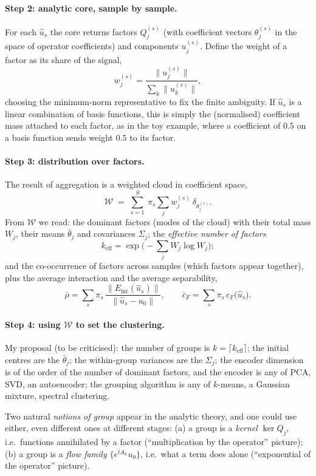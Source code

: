 \documentclass[11pt,a4paper]{article}
\newcommand{\Eint}{E_{\mathrm{int}}}
\begin{document}
\paragraph{Step 2: analytic core, sample by sample.}
For each $\hat u_s$ the core returns factors $Q^{(s)}_j$ (with coefficient vectors $\theta^{(s)}_j$ in the space of operator coefficients) and components $u^{(s)}_j$. Define the weight of a factor as its share of the signal,
\[
w^{(s)}_j=\frac{\|u^{(s)}_j\|}{\sum_k\|u^{(s)}_k\|},
\]
choosing the minimum-norm representative to fix the finite ambiguity. If $\hat u_s$ is a linear combination of basis functions, this is simply the (normalised) coefficient mass attached to each factor, as in the toy example, where a coefficient of $0.5$ on a basis function sends weight $0.5$ to its factor.

\paragraph{Step 3: distribution over factors.}
The result of aggregation is a weighted cloud in coefficient space,
\[
\mathcal W\;=\;\sum_{s=1}^{S}\ \pi_s\sum_{j}w^{(s)}_j\ \delta_{\theta^{(s)}_j}.
\]
From $\mathcal W$ we read: the dominant factors (modes of the cloud) with their total mass $W_j$, their means $\bar\theta_j$ and covariances $\Sigma_j$; the \emph{effective number of factors}
\[
k_{\mathrm{eff}}=\exp\Big(-\sum_j W_j\log W_j\Big);
\]
and the co-occurrence of factors across samples (which factors appear together), plus the average interaction and the average separability,
\[
\bar\rho=\sum_s\pi_s\,\frac{\|\Eint(\hat u_s)\|}{\|\hat u_s-u_0\|},\qquad \bar c_F=\sum_s\pi_s\,c_F\big(\hat u_s\big).
\]

\paragraph{Step 4: using $\mathcal W$ to set the clustering.}
My proposal (to be criticised): the number of groups is $k=\lceil k_{\mathrm{eff}}\rceil$; the initial centres are the $\bar\theta_j$; the within-group variances are the $\Sigma_j$; the encoder dimension is of the order of the number of dominant factors, and the encoder is any of PCA, SVD, an autoencoder; the grouping algorithm is any of $k$-means, a Gaussian mixture, spectral clustering.

Two natural \emph{notions of group} appear in the analytic theory, and one could use either, even different ones at different stages: (a) a group is a \emph{kernel} $\ker Q_j$, i.e.\ functions annihilated by a factor (``multiplication by the operator'' picture); (b) a group is a \emph{flow family} $\{e^{tA_n}u_0\}$, i.e.\ what a term does alone (``exponential of the operator'' picture).
\end{document}

